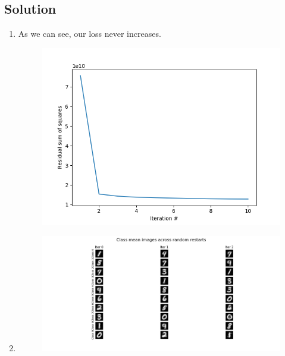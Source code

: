 \documentclass[submit]{harvardml}
\begin{document}
\subsection*{Solution}
\begin{enumerate}
    \item 
            As we can see, our loss never increases.

        \begin{figure}[h!]
            \centering
            \includegraphics[height=0.4\textheight]{HW4/P2part1plot.png}
        \end{figure}
\newpage
    \item 

    \begin{figure}[h!]
            \centering
            \includegraphics[height=0.4\textheight]{HW4/P1KmeansNonstandard.png}
        \end{figure}
    

\end{enumerate}
\end{document}
